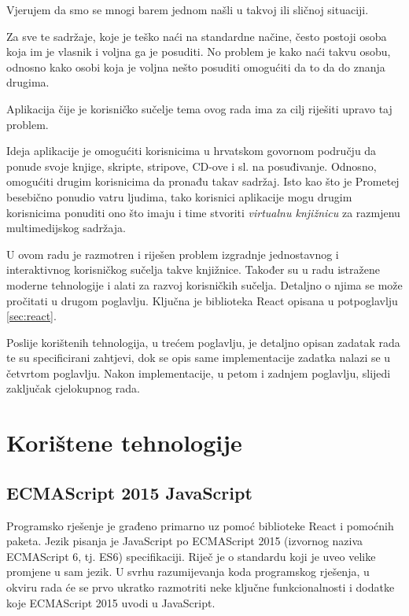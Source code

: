 \documentclass[times, utf8, zavrsni, numeric]{fer}
\newcommand{\razmakp}{\vspace{18pt}}
\newcommand{\razmaks}{\vspace{10pt}}
\begin{document}
Vjerujem da smo se mnogi barem jednom našli u takvoj ili sličnoj situaciji.

\razmakp

Za sve te sadržaje, koje je teško naći na standardne načine, često postoji osoba koja im je vlasnik i voljna ga je posuditi.
No problem je kako naći takvu osobu, odnosno kako osobi koja je voljna nešto posuditi omogućiti da to da do znanja drugima.
\razmaks

Aplikacija čije je korisničko sučelje tema ovog rada ima za cilj riješiti upravo taj problem.

\razmakp

Ideja aplikacije je omogućiti korisnicima u hrvatskom govornom području da ponude svoje knjige, skripte, stripove, CD-ove i sl. na posuđivanje.
Odnosno, omogućiti drugim korisnicima da pronađu takav sadržaj.
Isto kao što je Prometej besebično ponudio vatru ljudima, tako korisnici aplikacije mogu drugim korisnicima ponuditi ono što imaju i time stvoriti \emph{virtualnu knjižnicu} za razmjenu multimedijskog sadržaja.

\razmakp

U ovom radu je razmotren i riješen problem izgradnje jednostavnog i interaktivnog korisničkog sučelja takve knjižnice.
Također su u radu istražene moderne tehnologije i alati za razvoj korisničkih sučelja.
Detaljno o njima se može pročitati u drugom poglavlju.
Ključna je biblioteka React opisana u potpoglavlju \ref{sec:react}.

Poslije korištenih tehnologija, u trećem poglavlju, je detaljno opisan zadatak rada te su specificirani zahtjevi, dok se opis same implementacije zadatka nalazi se u četvrtom poglavlju.
Nakon implementacije, u petom i zadnjem poglavlju, slijedi zaključak cjelokupnog rada.


\chapter{Korištene tehnologije}



\section{ECMAScript 2015 JavaScript}

Programsko rješenje je građeno primarno uz pomoć biblioteke React i pomoćnih paketa.
Jezik pisanja je JavaScript po ECMAScript 2015 (izvornog naziva ECMAScript 6, tj. ES6) specifikaciji.
Riječ je o standardu koji je uveo velike promjene u sam jezik.
U svrhu razumijevanja koda programskog rješenja, u okviru rada će se prvo ukratko razmotriti neke ključne funkcionalnosti i dodatke koje ECMAScript 2015 uvodi u JavaScript.
\end{document}
